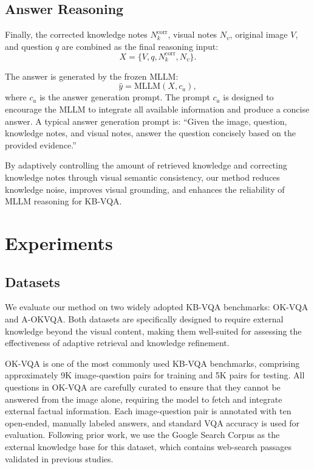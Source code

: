 \documentclass[manuscript,screen,review]{acmart}
\begin{document}
\subsection{Answer Reasoning}

Finally, the corrected knowledge notes $N_k^{\text{corr}}$, visual notes $N_v$, original image $V$, and question $q$ are combined as the final reasoning input:
\begin{equation}
X = \{V, q, N_k^{\text{corr}}, N_v\}.
\end{equation}

The answer is generated by the frozen MLLM:
\begin{equation}
\hat{y} = \text{MLLM}(X, c_a),
\end{equation}
where $c_a$ is the answer generation prompt. The prompt $c_a$ is designed to encourage the MLLM to integrate all available information and produce a concise answer. A typical answer generation prompt is: ``Given the image, question, knowledge notes, and visual notes, answer the question concisely based on the provided evidence.''

By adaptively controlling the amount of retrieved knowledge and correcting knowledge notes through visual semantic consistency, our method reduces knowledge noise, improves visual grounding, and enhances the reliability of MLLM reasoning for KB-VQA.

\section{Experiments}

\subsection{Datasets}

We evaluate our method on two widely adopted KB-VQA benchmarks: OK-VQA and A-OKVQA. Both datasets are specifically designed to require external knowledge beyond the visual content, making them well-suited for assessing the effectiveness of adaptive retrieval and knowledge refinement.

OK-VQA is one of the most commonly used KB-VQA benchmarks, comprising approximately 9K image-question pairs for training and 5K pairs for testing. All questions in OK-VQA are carefully curated to ensure that they cannot be answered from the image alone, requiring the model to fetch and integrate external factual information. Each image-question pair is annotated with ten open-ended, manually labeled answers, and standard VQA accuracy is used for evaluation. Following prior work, we use the Google Search Corpus as the external knowledge base for this dataset, which contains web-search passages validated in previous studies.
\end{document}
